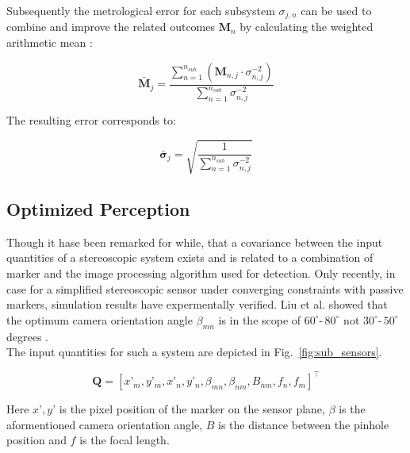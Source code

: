\documentclass[5p,times,procedia]{elsarticle}
\begin{document}
Subsequently the metrological error for each subsystem $\sigma_{j,n}$ can be used to combine and improve the related outcomes $\mathbf{M}_n$ by calculating the weighted arithmetic mean \cite{Price1972}:

\begin{equation}
	\mathbf{\bar{M}}_{j} = \frac{\sum_{n=1}^{n_{sub}} \left( \mathbf{M}_{n,j} \cdot \sigma_{n,j}^{-2} \right)}{\sum_{n=1}^{n_{sub}} \sigma_{n,j}^{-2}}
\end{equation}

The resulting error corresponds to:

\begin{equation}
	\mathbf{\bar{\sigma}}_{j} = \sqrt{ \frac{1}{\sum_{n=1}^{n_{sub}} \sigma_{n,j}^{-2}} }
\end{equation}


\subsection{Optimized Perception}
Though it hase been remarked for while\cite{Di_Leo_2011}, that a covariance between the input quantities of a stereoscopic system exists and is related to a combination of marker and the image processing algorithm used for detection. Only recently, in case for a simplified stereoscopic sensor under converging constraints with passive markers, simulation results have expermentally verified. Liu et al. showed that the optimum camera orientation angle $\beta_{mn}$ is in the scope of $60^{\circ} \text{-}\, 80^{\circ}$ \cite{Liu_2021} not $30^{\circ} \text{-}\, 50^{\circ}$ degrees \cite{Yang2018,Fooladgar2013,Sankowski2017}.\\

The input quantities for such a system are depicted in Fig.~\ref{fig:sub_sensors}.

\begin{equation*}
	\mathbf{Q}= \left[x’_m, y’_m, x’_n, y’_n, \beta_{mn}, \beta_{nm}, B_{nm}, f_{n},f_{m}\right]^{\top}
\end{equation*}

 Here $x’, y’$ is the pixel position of the marker on the sensor plane, $\beta$ is the aformentioned camera orientation angle, $B$ is the distance between the pinhole position and $f$ is the focal length. \\
 
\end{document}
